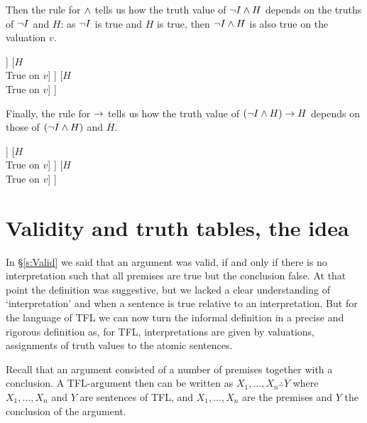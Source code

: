 Then the rule for $\mathbin{\wedge}$ tells us how the truth value of $\neg I\mathbin{\wedge} H$ depends on the truths of $\neg I$ and $H$: as $\neg I$ is true and $H$ is true, then $\neg I \mathbin{\wedge} H$ is also true on the valuation $v$.
\begin{center}
	\begin{forest}
		[$(\enot I\eand H)\mainconnective{\eif} H$\\
		[$(\enot I\mainconnective{\eand} H)$\\True on $v$
		[$\mainconnective{\enot} I$\\True on $v$
		[$I$\\False on $v$]
		]
		[$H$\\True on $v$]
		]
		[$H$\\True on $v$]
		]
	\end{forest}
\end{center}
Finally, the rule for $\rightarrow$ tells us how the truth value of $(\neg I\mathbin{\wedge} H)\rightarrow H$ depends on those of $(\neg I\mathbin{\wedge} H)$ and $H$.
\begin{center}
	\begin{forest}
		[$(\enot I\eand H)\mainconnective{\eif} H$\\True on $v$
		[$(\enot I\mainconnective{\eand} H)$\\True on $v$
		[$\mainconnective{\enot} I$\\True on $v$
		[$I$\\False on $v$]
		]
		[$H$\\True on $v$]
		]
		[$H$\\True on $v$]
		]
	\end{forest}
\end{center}



\section{Validity and truth tables, the idea}\label{sec:valtt}
In \S\ref{s:Valid} we said that an argument was valid, if and only if there is no interpretation such that all premises are true but the conclusion false. At that point the definition was suggestive, but we lacked a clear understanding of `interpretation' and when a sentence is true relative to an interpretation. But for the language of TFL we can now turn the informal definition in a precise and rigorous definition as, for TFL, interpretations are given by valuations, assignments of truth values to the atomic sentences. 

Recall that an argument consisted of a number of premises together with a conclusion. A TFL-argument then can be written as $X_1,\ldots,X_n\therefore Y$ where $X_1,\ldots,X_n$ and $Y$ are sentences of TFL, and $X_1,\ldots,X_n$ are the premises and $Y$ the conclusion of the argument.

